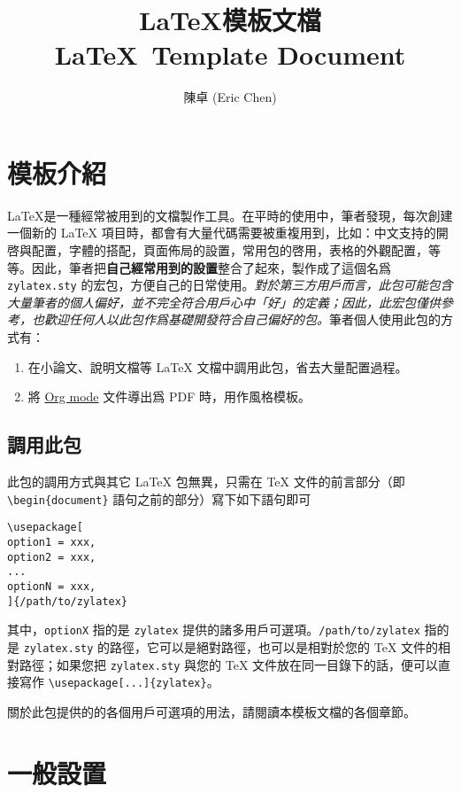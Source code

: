 \documentclass[
oneside,
12pt,
]{book}
\title{
  \Huge \LaTeX 模板文檔 \\
  \Large \LaTeX\ Template Document
}
\author{
  陳卓 (Eric Chen)
}
\date{\DTMtoday}
\begin{document}
\maketitle

\tableofcontents

\chapter{模板介紹}

\LaTeX 是一種經常被用到的文檔製作工具。在平時的使用中，筆者發現，每次創建一個新的 LaTeX 項目時，都會有大量代碼需要被重複用到，比如：中文支持的開啓與配置，字體的搭配，頁面佈局的設置，常用包的啓用，表格的外觀配置，等等。因此，筆者把\textbf{自己經常用到的設置}整合了起來，製作成了這個名爲 \texttt{zylatex.sty} 的宏包，方便自己的日常使用。\textit{對於第三方用戶而言，此包可能包含大量筆者的個人偏好，並不完全符合用戶心中「好」的定義；因此，此宏包僅供參考，也歡迎任何人以此包作爲基礎開發符合自己偏好的包。}筆者個人使用此包的方式有：

\begin{enumerate}
\item 在小論文、說明文檔等 LaTeX 文檔中調用此包，省去大量配置過程。
\item 將 \href{https://orgmode.org/}{Org mode} 文件導出爲 PDF 時，用作風格模板。
\end{enumerate}

\section{調用此包}

此包的調用方式與其它 LaTeX 包無異，只需在 TeX 文件的前言部分（即 \texttt{\textbackslash begin\{document\}} 語句之前的部分）寫下如下語句即可

\begin{verbatim}
\usepackage[
option1 = xxx,
option2 = xxx,
...
optionN = xxx,
]{/path/to/zylatex}
\end{verbatim}

其中，\texttt{optionX} 指的是 \texttt{zylatex} 提供的諸多用戶可選項。\texttt{/path/to/zylatex} 指的是 \texttt{zylatex.sty} 的路徑，它可以是絕對路徑，也可以是相對於您的 TeX 文件的相對路徑；如果您把 \texttt{zylatex.sty} 與您的 TeX 文件放在同一目錄下的話，便可以直接寫作 \texttt{\textbackslash usepackage[...]\{zylatex\}}。

關於此包提供的的各個用戶可選項的用法，請閱讀本模板文檔的各個章節。

\chapter{一般設置}
\end{document}

